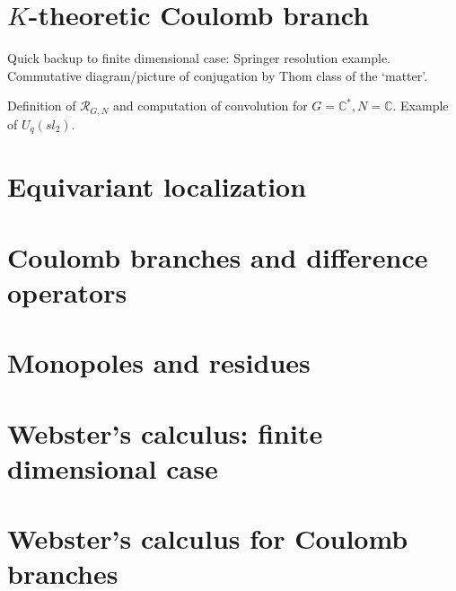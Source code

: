 \documentclass[11pt]{amsart}
\theoremstyle{definition}
\newcommand{\bC}{\mathbb{C}}
\newcommand{\Rc}{{\mathcal{R}}}
\numberwithin{equation}{subsection}
\numberwithin{figure}{subsection}
\begin{document}
\section{$K$-theoretic Coulomb branch}
Quick backup to finite dimensional case: Springer resolution example. Commutative diagram/picture of conjugation by Thom class of the `matter'.

Definition of $\Rc_{G,N}$ and computation of convolution for $G=\bC^*,N=\bC$. Example of $U_q(sl_2)$.

\section{Equivariant localization}

\section{Coulomb branches and difference operators}

\section{Monopoles and residues}

\section{Webster's calculus: finite dimensional case}

\section{Webster's calculus for Coulomb branches}


 
\end{document}
